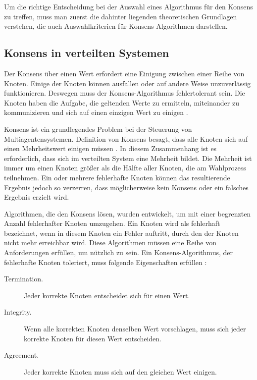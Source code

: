 Um die richtige Entscheidung bei der Auswahl eines Algorithmus für den Konsens zu treffen, muss man zuerst die dahinter liegenden theoretischen Grundlagen verstehen, die auch Auswahlkriterien für Konsens-Algorithmen darstellen.

\subsection{Konsens in verteilten Systemen}

Der Konsens über einen Wert erfordert eine Einigung zwischen einer Reihe von Knoten. Einige der Knoten können ausfallen oder auf andere Weise unzuverlässig funktionieren. Deswegen muss der Konsens-Algorithmus fehlertolerant sein. Die Knoten haben die Aufgabe, die geltenden Werte zu ermitteln, miteinander zu kommunizieren und sich auf einen einzigen Wert zu einigen \cite{Fischer83impossibilityof}.

Konsens ist ein grundlegendes Problem bei der Steuerung von Multiagentensystemen. Definition von Konsens besagt, dass alle Knoten sich auf einen Mehrheitswert einigen müssen \cite{Saber03consensusproblems}. In diesem Zusammenhang ist es erforderlich, dass sich im verteilten System eine Mehrheit bildet. Die Mehrheit ist immer um einen Knoten größer als die Hälfte aller Knoten, die am Wahlprozess teilnehmen. Ein oder mehrere fehlerhafte Knoten können das resultierende Ergebnis jedoch so verzerren, dass möglicherweise kein Konsens oder ein falsches Ergebnis erzielt wird.

Algorithmen, die den Konsens lösen, wurden entwickelt, um mit einer begrenzten Anzahl fehlerhafter Knoten umzugehen. Ein Knoten wird als fehlerhaft bezeichnet, wenn in diesem Knoten ein Fehler auftritt, durch den der Knoten nicht mehr erreichbar wird. Diese Algorithmen müssen eine Reihe von Anforderungen erfüllen, um nützlich zu sein. Ein Konsens-Algorithmus, der fehlerhafte Knoten toleriert, muss folgende Eigenschaften erfüllen \cite{Fischer83impossibilityof}:

\begin{description} 
	\item[Termination.] Jeder korrekte Knoten entscheidet sich für einen Wert.
	
	\item[Integrity.] Wenn alle korrekten Knoten denselben Wert vorschlagen, muss sich jeder korrekte Knoten für diesen Wert entscheiden.
	
	\item[Agreement.] Jeder korrekte Knoten muss sich auf den gleichen Wert einigen.
\end{description}

